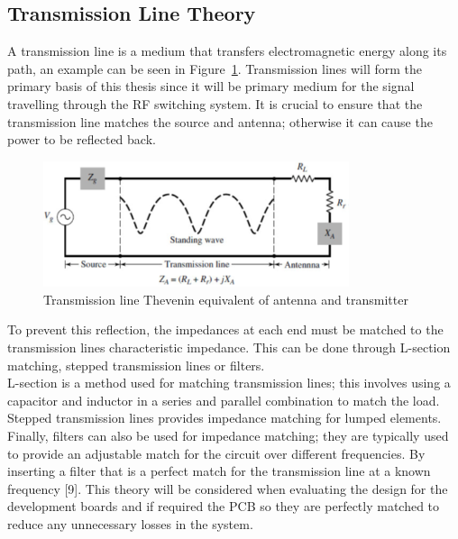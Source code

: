 \documentclass[12pt,openany,a4paper]{book}
\newcommand{\fig}[1]  {Figure~\ref{#1}}		%
\begin{document}
\subsection{Transmission Line Theory}	\label{sec:tran_theory}
A transmission line is a medium that transfers electromagnetic energy along its path, an example can be seen in \fig{fig:tline}. Transmission lines will form the primary basis of this thesis since it will be primary medium for the signal travelling through the RF switching system. It is crucial to ensure that the transmission line matches the source and antenna; otherwise it can cause the power to be reflected back. \newline
\begin{figure}[H]
	\centering
    \includegraphics[width=0.8\textwidth]{tline.png}
	\caption{Transmission line Thevenin equivalent of antenna and transmitter}
	\label{fig:tline}
\end{figure} 
To prevent this reflection, the impedances at each end must be matched to the transmission lines characteristic impedance. This can be done through L-section matching, stepped transmission lines or filters.  \\[0.1cm]
L-section is a method used for matching transmission lines; this involves using a capacitor and inductor in a series and parallel combination to match the load. Stepped transmission lines provides impedance matching for lumped elements. Finally, filters can also be used for impedance matching; they are typically used to provide an adjustable match for the circuit over different frequencies. By inserting a filter that is a perfect match for the transmission line at a known frequency [9]. This theory will be considered when evaluating the design for the development boards and if required the PCB so they are perfectly matched to reduce any unnecessary losses in the system.
\end{document}
